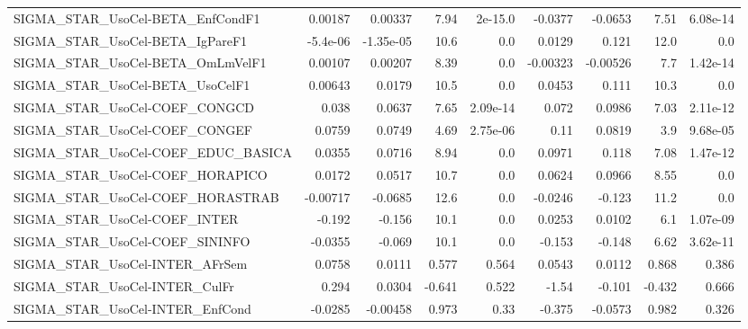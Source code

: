 \begin{tabular}{lrrrrrrrr}
SIGMA\_STAR\_UsoCel-BETA\_EnfCondF1      &     0.00187 &      0.00337 &     7.94 &  2e-15.0 &    -0.0377 &     -0.0653 &         7.51 &      6.08e-14 \\
SIGMA\_STAR\_UsoCel-BETA\_IgPareF1       &    -5.4e-06 &    -1.35e-05 &     10.6 &      0.0 &     0.0129 &       0.121 &         12.0 &           0.0 \\
SIGMA\_STAR\_UsoCel-BETA\_OmLmVelF1      &     0.00107 &      0.00207 &     8.39 &      0.0 &   -0.00323 &    -0.00526 &          7.7 &      1.42e-14 \\
SIGMA\_STAR\_UsoCel-BETA\_UsoCelF1       &     0.00643 &       0.0179 &     10.5 &      0.0 &     0.0453 &       0.111 &         10.3 &           0.0 \\
SIGMA\_STAR\_UsoCel-COEF\_CONGCD         &       0.038 &       0.0637 &     7.65 & 2.09e-14 &      0.072 &      0.0986 &         7.03 &      2.11e-12 \\
SIGMA\_STAR\_UsoCel-COEF\_CONGEF         &      0.0759 &       0.0749 &     4.69 & 2.75e-06 &       0.11 &      0.0819 &          3.9 &      9.68e-05 \\
SIGMA\_STAR\_UsoCel-COEF\_EDUC\_BASICA    &      0.0355 &       0.0716 &     8.94 &      0.0 &     0.0971 &       0.118 &         7.08 &      1.47e-12 \\
SIGMA\_STAR\_UsoCel-COEF\_HORAPICO       &      0.0172 &       0.0517 &     10.7 &      0.0 &     0.0624 &      0.0966 &         8.55 &           0.0 \\
SIGMA\_STAR\_UsoCel-COEF\_HORASTRAB      &    -0.00717 &      -0.0685 &     12.6 &      0.0 &    -0.0246 &      -0.123 &         11.2 &           0.0 \\
SIGMA\_STAR\_UsoCel-COEF\_INTER          &      -0.192 &       -0.156 &     10.1 &      0.0 &     0.0253 &      0.0102 &          6.1 &      1.07e-09 \\
SIGMA\_STAR\_UsoCel-COEF\_SININFO        &     -0.0355 &       -0.069 &     10.1 &      0.0 &     -0.153 &      -0.148 &         6.62 &      3.62e-11 \\
SIGMA\_STAR\_UsoCel-INTER\_AFrSem        &      0.0758 &       0.0111 &    0.577 &    0.564 &     0.0543 &      0.0112 &        0.868 &         0.386 \\
SIGMA\_STAR\_UsoCel-INTER\_CulFr         &       0.294 &       0.0304 &   -0.641 &    0.522 &      -1.54 &      -0.101 &       -0.432 &         0.666 \\
SIGMA\_STAR\_UsoCel-INTER\_EnfCond       &     -0.0285 &     -0.00458 &    0.973 &     0.33 &     -0.375 &     -0.0573 &        0.982 &         0.326 \\

\end{tabular}
